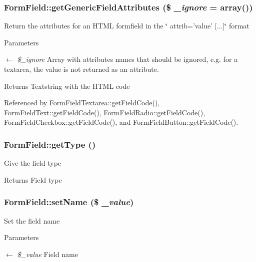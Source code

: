 \subsubsection[{getGenericFieldAttributes}]{\setlength{\rightskip}{0pt plus 5cm}FormField::getGenericFieldAttributes (\$ {\em \_\-ignore} = {\ttfamily array()})}\label{classFormField_a9f9d136ba8b4a793f22370aff43d592d}
Return the attributes for an HTML formfield in the \char`\"{} attrib='value' \mbox{[}...\mbox{]}\char`\"{} format


\begin{DoxyParams}{Parameters}
\item[\mbox{$\leftarrow$} {\em \$\_\-ignore}]Array with attributes names that should be ignored, e.g. for a textarea, the value is not returned as an attribute. \end{DoxyParams}
\begin{DoxyReturn}{Returns}
Textstring with the HTML code 
\end{DoxyReturn}


Referenced by FormFieldTextarea::getFieldCode(), FormFieldText::getFieldCode(), FormFieldRadio::getFieldCode(), FormFieldCheckbox::getFieldCode(), and FormFieldButton::getFieldCode().

\subsubsection[{getType}]{\setlength{\rightskip}{0pt plus 5cm}FormField::getType ()}\label{classFormField_a1f64b737bccb6b2827f8c5665b9920c7}
Give the field type \begin{DoxyReturn}{Returns}
Field type 
\end{DoxyReturn}
\subsubsection[{setName}]{\setlength{\rightskip}{0pt plus 5cm}FormField::setName (\$ {\em \_\-value})}\label{classFormField_ad57e32bd53170af060e869b3b60f0ef7}
Set the field name 
\begin{DoxyParams}{Parameters}
\item[\mbox{$\leftarrow$} {\em \$\_\-value}]Field name \end{DoxyParams}
